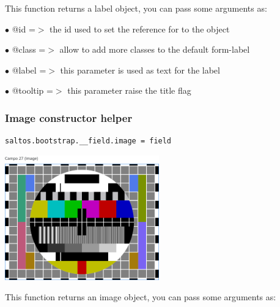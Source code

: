 \documentclass[a4paper]{article}
\begin{document}
This function returns a label object, you can pass some arguments as:

\begin{compactitem}
\item[\color{myblue}$\bullet$] @id      =$>$ the id used to set the reference for to the object
\item[\color{myblue}$\bullet$] @class   =$>$ allow to add more classes to the default form-label
\item[\color{myblue}$\bullet$] @label   =$>$ this parameter is used as text for the label
\item[\color{myblue}$\bullet$] @tooltip =$>$ this parameter raise the title flag
\end{compactitem}

\hypertarget{toc72}{}
\subsubsection{Image constructor helper}

\begin{lstlisting}
saltos.bootstrap.__field.image = field
\end{lstlisting}

\begin{center}\includegraphics[width=0.5\textwidth]{../ujest/snaps/test-bootstrap-js-bootstrap-campo-27-image-1-snap.png}\end{center}

This function returns an image object, you can pass some arguments as:
\end{document}

